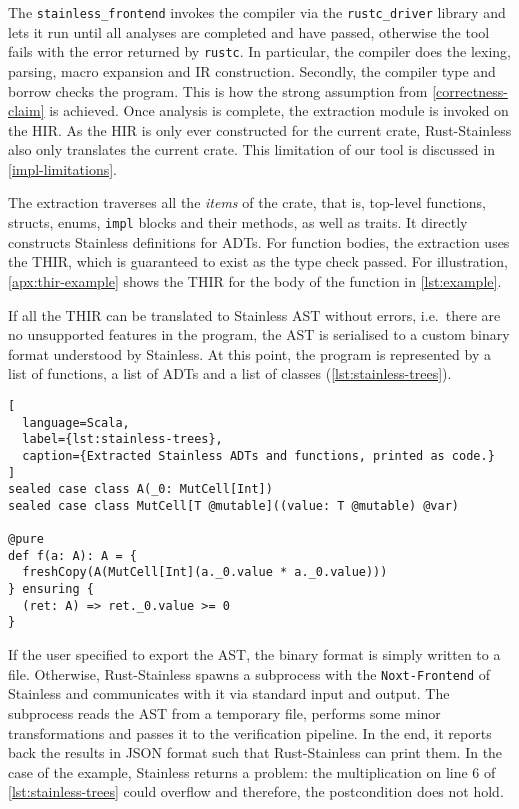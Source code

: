 The \lstinline!stainless_frontend! invokes the compiler via the
\lstinline!rustc_driver! library and lets it run until all analyses are
completed and have passed, otherwise the tool fails with the error returned by
\lstinline!rustc!. In particular, the compiler does the lexing, parsing, macro
expansion and IR construction. Secondly, the compiler type and borrow checks the
program. This is how the strong assumption from \autoref{correctness-claim} is
achieved. Once analysis is complete, the extraction module is invoked on the
HIR. As the HIR is only ever constructed for the current crate, Rust-Stainless
also only translates the current crate. This limitation of our tool is discussed
in \autoref{impl-limitations}.

The extraction traverses all the \emph{items} of the crate, that is, top-level
functions, structs, enums, \lstinline!impl! blocks and their methods, as well as
traits. It directly constructs Stainless definitions for ADTs. For function
bodies, the extraction uses the THIR, which is guaranteed to exist as the type
check passed. For illustration, \autoref{apx:thir-example} shows the THIR for
the body of the function in \autoref{lst:example}.

If all the THIR can be translated to Stainless AST without errors, i.e.~there
are no unsupported features in the program, the AST is serialised to a custom
binary format understood by Stainless. At this point, the program is represented
by a list of functions, a list of ADTs and a list of classes
(\autoref{lst:stainless-trees}).

\begin{lstlisting}[
  language=Scala,
  label={lst:stainless-trees},
  caption={Extracted Stainless ADTs and functions, printed as code.}
]
sealed case class A(_0: MutCell[Int])
sealed case class MutCell[T @mutable]((value: T @mutable) @var)

@pure
def f(a: A): A = {
  freshCopy(A(MutCell[Int](a._0.value * a._0.value)))
} ensuring {
  (ret: A) => ret._0.value >= 0
}
\end{lstlisting}

If the user specified to export the AST, the binary format is simply written to
a file. Otherwise, Rust-Stainless spawns a subprocess with the
\lstinline!Noxt-Frontend! of Stainless and communicates with it via standard
input and output. The subprocess reads the AST from a temporary file, performs
some minor transformations and passes it to the verification pipeline. In the
end, it reports back the results in JSON format such that Rust-Stainless can
print them. In the case of the example, Stainless returns a problem: the
multiplication on line 6 of \autoref{lst:stainless-trees} could overflow and
therefore, the postcondition does not hold.



